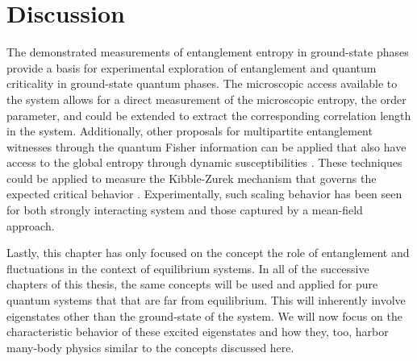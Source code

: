 \section{Discussion}

The demonstrated measurements of entanglement entropy in ground-state phases provide a basis for experimental exploration of entanglement and quantum criticality in ground-state quantum phases. The microscopic access available to the system allows for a direct measurement of the microscopic entropy, the order parameter, and could be extended to extract the corresponding correlation length in the system. Additionally, other proposals for multipartite entanglement witnesses through the quantum Fisher information can be applied that also have access to the global entropy through dynamic susceptibilities \cite{Hauke2016}. These techniques could be applied to measure the Kibble-Zurek mechanism that governs the expected critical behavior \cite{Polkovnikov2005,Zurek2005}. Experimentally, such scaling behavior has been seen for both strongly interacting system and those captured by a mean-field approach\cite{Endres2012,Anquez2016,Clark2016,Keesling2019}. 

Lastly, this chapter has only focused on the concept the role of entanglement and fluctuations in the context of equilibrium systems. In all of the successive chapters of this thesis, the same concepts will be used and applied for pure quantum systems that that are far from equilibrium. This will inherently involve eigenstates other than the ground-state of the system. We will now focus on the characteristic behavior of these excited eigenstates and how they, too, harbor many-body physics similar to the concepts discussed here.
